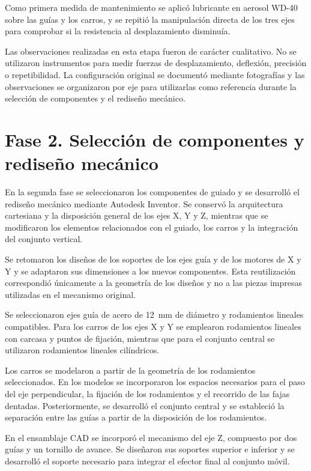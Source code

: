 Como primera medida de mantenimiento se aplicó lubricante en aerosol WD-40 sobre las guías y los carros, y se repitió la manipulación directa de los tres ejes para comprobar si la resistencia al desplazamiento disminuía.

Las observaciones realizadas en esta etapa fueron de carácter cualitativo. No se utilizaron instrumentos para medir fuerzas de desplazamiento, deflexión, precisión o repetibilidad. La configuración original se documentó mediante fotografías y las observaciones se organizaron por eje para utilizarlas como referencia durante la selección de componentes y el rediseño mecánico.



\section{Fase 2. Selección de componentes y rediseño mecánico}

En la segunda fase se seleccionaron los componentes de guiado y se desarrolló el rediseño mecánico mediante Autodesk Inventor. Se conservó la arquitectura cartesiana y la disposición general de los ejes X, Y y Z, mientras que se modificaron los elementos relacionados con el guiado, los carros y la integración del conjunto vertical.

Se retomaron los diseños de los soportes de los ejes guía y de los motores de X y Y y se adaptaron sus dimensiones a los nuevos componentes. Esta reutilización correspondió únicamente a la geometría de los diseños y no a las piezas impresas utilizadas en el mecanismo original.

Se seleccionaron ejes guía de acero de 12~mm de diámetro y rodamientos lineales compatibles. Para los carros de los ejes X y Y se emplearon rodamientos lineales con carcasa y puntos de fijación, mientras que para el conjunto central se utilizaron rodamientos lineales cilíndricos.

Los carros se modelaron a partir de la geometría de los rodamientos seleccionados. En los modelos se incorporaron los espacios necesarios para el paso del eje perpendicular, la fijación de los rodamientos y el recorrido de las fajas dentadas. Posteriormente, se desarrolló el conjunto central y se estableció la separación entre las guías a partir de la disposición de los rodamientos.

En el ensamblaje CAD se incorporó el mecanismo del eje Z, compuesto por dos guías y un tornillo de avance. Se diseñaron sus soportes superior e inferior y se desarrolló el soporte necesario para integrar el efector final al conjunto móvil.


